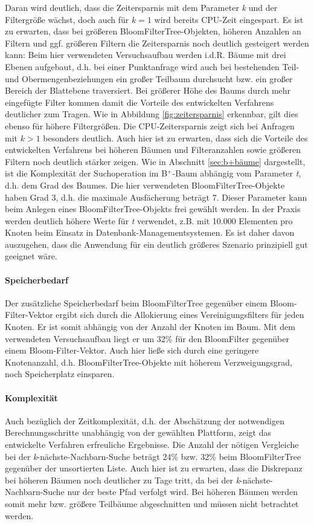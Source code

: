 Daran wird deutlich, dass die Zeitersparnis mit dem Parameter \textit{k} und der Filtergröße wächst, doch auch für $k=1$ wird bereits CPU-Zeit eingespart. Es ist zu erwarten, dass bei größeren BloomFilterTree-Objekten, höheren Anzahlen an Filtern und ggf. größeren Filtern die Zeitersparnis noch deutlich gesteigert werden kann: Beim hier verwendeten Versuchsaufbau werden i.d.R. Bäume mit drei Ebenen aufgebaut, d.h. bei einer Punktanfrage wird auch bei bestehenden Teil- und Obermengenbeziehungen ein großer Teilbaum durchsucht bzw. ein großer Bereich der Blattebene traversiert. Bei größerer Höhe des Baums durch mehr eingefügte Filter kommen damit die Vorteile des entwickelten Verfahrens deutlicher zum Tragen. Wie in Abbildung \ref{fig:zeitersparnis} erkennbar, gilt dies ebenso für höhere Filtergrößen. Die CPU-Zeitersparnis zeigt sich bei Anfragen mit $k>1$ besonders deutlich. Auch hier ist zu erwarten, dass sich die Vorteile des entwickelten Verfahrens bei höheren Bäumen und Filteranzahlen sowie größeren Filtern noch deutlich stärker zeigen.
Wie in Abschnitt \ref{sec:b+bäume} dargestellt, ist die Komplexität der Suchoperation im B$^+$-Baum abhängig vom Parameter \textit{t}, d.h. dem Grad des Baumes. Die hier verwendeten Bloom\-Filter\-Tree-Objekte haben Grad 3, d.h. die maximale Ausfächerung beträgt 7. Dieser Parameter kann beim Anlegen eines BloomFilterTree-Objekts frei gewählt werden. In der Praxis werden deutlich höhere Werte für \textit{t} verwendet, z.B. mit 10.000 Elementen pro Knoten beim Einsatz in Datenbank-Managementsystemen. Es ist daher davon auszugehen, dass die Anwendung für ein deutlich größeres Szenario prinzipiell gut geeignet wäre.  
\paragraph*{Speicherbedarf}
Der zusätzliche Speicherbedarf beim BloomFilterTree gegenüber einem Bloom-Filter-Vektor ergibt sich durch die Allokierung eines Vereinigungsfilters für jeden Knoten. Er ist somit abhängig von der Anzahl der Knoten im Baum. Mit dem verwendeten Versuchsaufbau liegt er um 32\% für den BloomFilter gegenüber einem Bloom-Filter-Vektor. Auch hier ließe sich durch eine geringere Knotenanzahl, d.h. BloomFilterTree-Objekte mit höherem Verzweigungsgrad, noch Speicherplatz einsparen. 
\paragraph*{Komplexität}
Auch bezüglich der Zeitkomplexität, d.h. der Abschätzung der notwendigen Berechnungsschritte unabhängig von der gewählten Plattform, zeigt das entwickelte Verfahren erfreuliche Ergebnisse. Die Anzahl der nötigen Vergleiche bei der \textit{k}-nächste-Nachbarn-Suche beträgt 24\% bzw. 32\% beim BloomFilterTree gegenüber der unsortierten Liste. Auch hier ist zu erwarten, dass die Diskrepanz bei höheren Bäumen noch deutlicher zu Tage tritt, da bei der \textit{k}-nächste-Nachbarn-Suche nur der beste Pfad verfolgt wird. Bei höheren Bäumen werden somit mehr bzw. größere Teilbäume abgeschnitten und müssen nicht betrachtet werden. 
